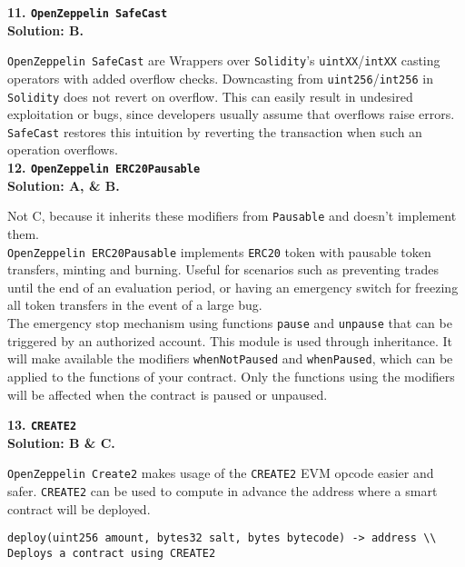 \textbf{11. \texttt{OpenZeppelin SafeCast}}\label{sec:exam3_q11}\\

\textbf{Solution: B.}

\verb|OpenZeppelin SafeCast| are Wrappers over \verb|Solidity|'s \verb|uintXX|/\verb|intXX| casting operators with added overflow checks.
Downcasting from \verb|uint256|/\verb|int256| in \verb|Solidity| does not revert on overflow.
This can easily result in undesired exploitation or bugs, since developers usually assume that overflows raise errors.
\verb|SafeCast| restores this intuition by reverting the transaction when such an operation overflows.\\

\textbf{12. \texttt{OpenZeppelin ERC20Pausable}}\label{sec:exam3_q12}\\

\textbf{Solution: A, \& B.}

Not C, because it inherits these modifiers from \verb|Pausable| and doesn't implement them.\\

\verb|OpenZeppelin ERC20Pausable| implements \verb|ERC20| token with pausable token transfers, minting and burning.
Useful for scenarios such as preventing trades until the end of an evaluation period, or having an emergency switch for freezing all token transfers in the event of a large bug.\\

The emergency stop mechanism using functions \verb|pause| and \verb|unpause| that can be triggered by an authorized account.
This module is used through inheritance.
It will make available the modifiers \verb|whenNotPaused| and \verb|whenPaused|, which can be applied to the functions of your contract.
Only the functions using the modifiers will be affected when the contract is paused or unpaused.\\

\pagebreak

\textbf{13. \texttt{CREATE2}}\label{sec:exam3_q13}\\

\textbf{Solution: B \& C.}

\verb|OpenZeppelin Create2| makes usage of the \verb|CREATE2| EVM opcode easier and safer.
\verb|CREATE2| can be used to compute in advance the address where a smart contract will be deployed.

\begin{lstlisting}[language=Solidity, style=solStyle]
deploy(uint256 amount, bytes32 salt, bytes bytecode) -> address \\ Deploys a contract using CREATE2
\end{lstlisting}

